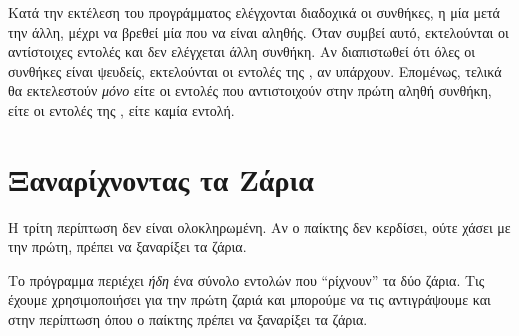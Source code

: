 \documentclass[a4paper,11pt,oneside]{book}
\begin{document}

Κατά την εκτέλεση του προγράμματος ελέγχονται διαδοχικά οι συνθήκες, η μία μετά την άλλη, μέχρι να βρεθεί μία που να είναι αληθής. Όταν συμβεί αυτό, εκτελούνται οι αντίστοιχες εντολές και δεν ελέγχεται άλλη συνθήκη. Αν διαπιστωθεί ότι όλες οι συνθήκες είναι ψευδείς, εκτελούνται οι εντολές της , αν υπάρχουν. Επομένως, τελικά θα εκτελεστούν \emph{μόνο} είτε οι εντολές που αντιστοιχούν στην πρώτη αληθή συνθήκη, είτε οι εντολές της , είτε καμία εντολή.

\section{Ξαναρίχνοντας τα Ζάρια}

\begin{question}
Η τρίτη περίπτωση δεν είναι ολοκληρωμένη. Αν ο παίκτης δεν κερδίσει, ούτε χάσει με την πρώτη, πρέπει να ξαναρίξει τα ζάρια.
\end{question}

Το πρόγραμμα περιέχει \emph{ήδη} ένα σύνολο εντολών που ``ρίχνουν'' τα δύο ζάρια. Τις έχουμε χρησιμοποιήσει για την πρώτη ζαριά και μπορούμε να τις αντιγράψουμε και στην περίπτωση όπου ο παίκτης πρέπει να ξαναρίξει τα ζάρια. 

\end{document}
